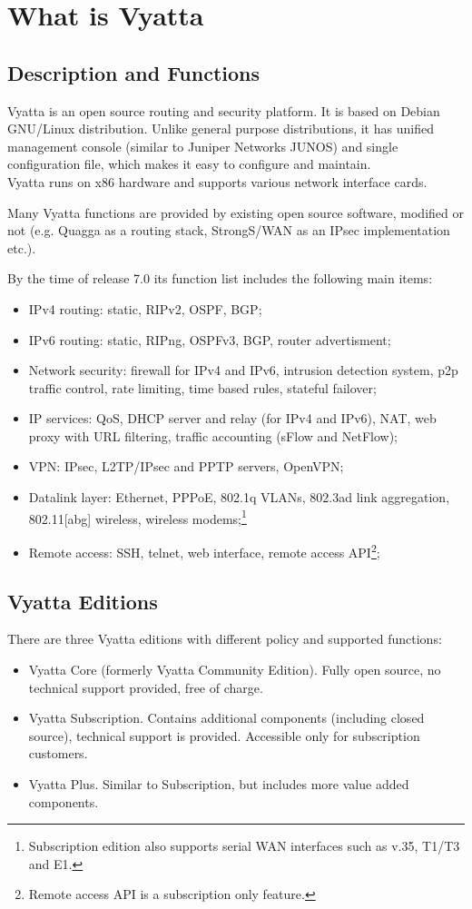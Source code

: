 \chapter{What is Vyatta}
\section{Description and Functions}
Vyatta is an open source routing and security platform. It is based on Debian GNU/Linux distribution. Unlike general purpose distributions, it has unified management console (similar to Juniper Networks JUNOS) and single configuration file, which makes it easy to configure and maintain. \\
Vyatta runs on x86 hardware and supports various network interface cards. 

Many Vyatta functions are provided by existing open source software, modified or not (e.g. Quagga as a routing stack, StrongS/WAN as an IPsec implementation etc.).

By the time of release 7.0 its function list includes the following main items:
\begin{itemize}
 \item IPv4 routing: static, RIPv2, OSPF, BGP;
 \item IPv6 routing: static, RIPng, OSPFv3, BGP, router advertisment;
 \item Network security: firewall for IPv4 and IPv6, intrusion detection system, p2p traffic control, rate limiting,
 time based rules, stateful failover;
 \item IP services: QoS, DHCP server and relay (for IPv4 and IPv6), NAT, web proxy with URL filtering, traffic
 accounting (sFlow and NetFlow);
 \item VPN: IPsec, L2TP/IPsec and PPTP servers, OpenVPN;
 \item Datalink layer: Ethernet, PPPoE, 802.1q VLANs, 802.3ad link aggregation, 802.11[abg] wireless, wireless
 modems;\footnote{Subscription edition also supports serial WAN interfaces such as v.35, T1/T3 and E1.}
 \item Remote access: SSH, telnet, web interface, remote access API\footnote{Remote access API is a subscription
 only feature.};
\end{itemize}

\section{Vyatta Editions}
There are three Vyatta editions with different policy and supported functions:
\begin{itemize}
 \item Vyatta Core (formerly Vyatta Community Edition). Fully open source, no technical support provided, free of
 charge.
 \item Vyatta Subscription. Contains additional components (including closed source), technical support is provided.
 Accessible only for subscription customers.
 \item Vyatta Plus. Similar to Subscription, but includes more value added components. 
\end{itemize}

